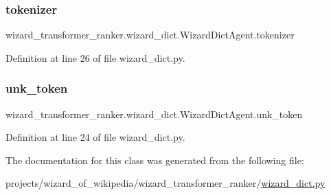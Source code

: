 \subsubsection{\texorpdfstring{tokenizer}{tokenizer}}
{\footnotesize\ttfamily wizard\+\_\+transformer\+\_\+ranker.\+wizard\+\_\+dict.\+Wizard\+Dict\+Agent.\+tokenizer}



Definition at line 26 of file wizard\+\_\+dict.\+py.

\mbox{\label{classwizard__transformer__ranker_1_1wizard__dict_1_1WizardDictAgent_affda964efc02d09b21e3c630b7f9609f}} 
\subsubsection{\texorpdfstring{unk\+\_\+token}{unk\_token}}
{\footnotesize\ttfamily wizard\+\_\+transformer\+\_\+ranker.\+wizard\+\_\+dict.\+Wizard\+Dict\+Agent.\+unk\+\_\+token}



Definition at line 24 of file wizard\+\_\+dict.\+py.



The documentation for this class was generated from the following file\+:\begin{DoxyCompactItemize}
\item 
projects/wizard\+\_\+of\+\_\+wikipedia/wizard\+\_\+transformer\+\_\+ranker/\hyperlink{wizard__dict_8py}{wizard\+\_\+dict.\+py}\end{DoxyCompactItemize}
